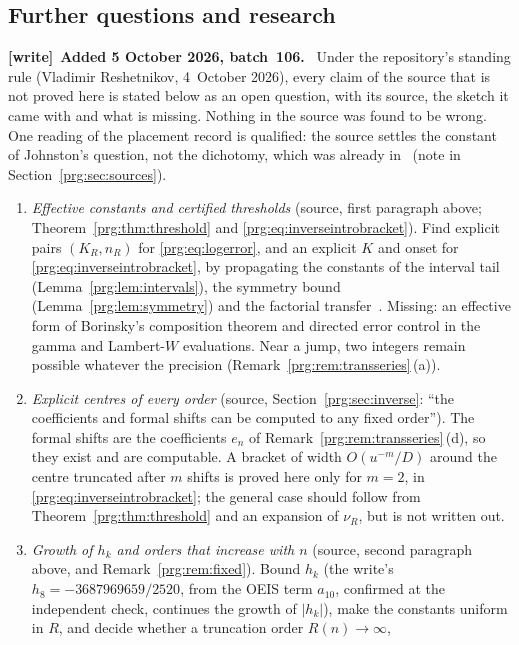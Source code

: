 \documentclass[11pt,letterpaper]{article}
\numberwithin{equation}{section}
\theoremstyle{definition}\newtheorem{definition}[theorem]{Definition}
\theoremstyle{remark}\newtheorem{remark}[theorem]{Remark}
\newenvironment{writenote}[1][]{\par\smallskip\begingroup\small
 \noindent\textbf{[write]}\if\relax\detokenize{#1}\relax\else~\textbf{#1.}\fi\ }%
 {\par\endgroup\smallskip}
\begin{document}
\subsection{Further questions and research}\label{prg:sec:further}
\begin{writenote}[Added 5 October 2026, batch~106]
Under the repository's standing rule (Vladimir Reshetnikov, 4~October 2026),
every claim of the source that is not proved here is stated below as an open
question, with its source, the sketch it came with and what is missing.
Nothing in the source was found to be wrong. One reading of the placement
record is qualified: the source settles the constant of Johnston's question,
not the dichotomy, which was already in~\cite{BBFGP} (note in
Section~\ref{prg:sec:sources}).
\begin{enumerate}
\item\label{prg:q:effective} \emph{Effective constants and certified
 thresholds} (source, first paragraph above; Theorem~\ref{prg:thm:threshold}
 and \eqref{prg:eq:inverseintrobracket}). Find explicit pairs $(K_R,n_R)$ for
 \eqref{prg:eq:logerror}, and an explicit $K$ and onset for
 \eqref{prg:eq:inverseintrobracket}, by propagating the constants of the
 interval tail (Lemma~\ref{prg:lem:intervals}), the symmetry bound
 (Lemma~\ref{prg:lem:symmetry}) and the factorial transfer~\cite{Borinsky}.
 Missing: an effective form of Borinsky's composition theorem and directed
 error control in the gamma and Lambert-$W$ evaluations. Near a jump, two
 integers remain possible whatever the precision
 (Remark~\ref{prg:rem:transseries}\,(a)).
\item\label{prg:q:shifts} \emph{Explicit centres of every order} (source,
 Section~\ref{prg:sec:inverse}: ``the coefficients and formal shifts can be
 computed to any fixed order''). The formal shifts are the coefficients
 $e_n$ of Remark~\ref{prg:rem:transseries}\,(d), so they exist and are
 computable. A bracket of width $O(u^{-m}/D)$ around the centre truncated
 after $m$ shifts is proved here only for $m=2$, in
 \eqref{prg:eq:inverseintrobracket}; the general case should follow from
 Theorem~\ref{prg:thm:threshold} and an expansion of $\nu_R$, but is not
 written out.
\item\label{prg:q:growth} \emph{Growth of $h_k$ and orders that increase
 with $n$} (source, second paragraph above, and
 Remark~\ref{prg:rem:fixed}). Bound $h_k$ (the write's $h_8=-3687969659/2520$,
 from the OEIS term $a_{10}$, confirmed at the independent check, continues
 the growth of $|h_k|$), make the
 constants uniform in $R$, and decide whether a truncation order $R(n)\to\infty$,

\end{enumerate}
\end{writenote}
\end{document}
